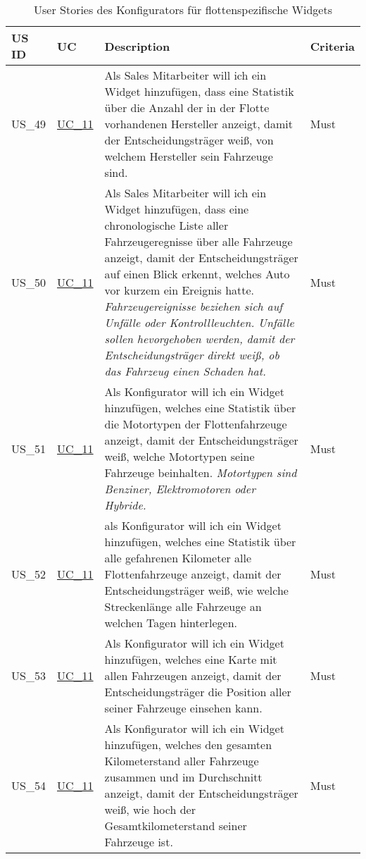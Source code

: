   \label{FlottenWidgets}
  \sffamily
  \begin{footnotesize}
    \begin{longtable}[L L L L ]{ p{} p{} p{} p{}}
      \caption                       %
          {User Stories des Konfigurators für flottenspezifische Widgets} %
          \\
      \toprule
      \textbf{US ID} & \textbf{UC} & \textbf{Description} & \textbf{Criteria} \\
      \midrule
      \hypertarget{Ref:US49}{US\_49} & \hyperlink{Ref:UC11}{UC\_11} & Als Sales Mitarbeiter will ich ein Widget hinzufügen, dass eine Statistik über die Anzahl der in der Flotte vorhandenen Hersteller anzeigt, damit der Entscheidungsträger weiß, von welchem Hersteller sein Fahrzeuge sind. & Must  \\
      \hypertarget{Ref:US50}{US\_50} & \hyperlink{Ref:UC11}{UC\_11} & Als Sales Mitarbeiter will ich ein Widget hinzufügen, dass eine chronologische Liste aller Fahrzeugeregnisse über alle Fahrzeuge anzeigt, damit der Entscheidungsträger auf einen Blick erkennt, welches Auto vor kurzem ein Ereignis hatte.
      \newline\newline
      \emph{Fahrzeugereignisse beziehen sich auf Unfälle oder Kontrollleuchten. Unfälle sollen hevorgehoben werden, damit der Entscheidungsträger direkt weiß, ob das Fahrzeug einen Schaden hat.} & Must \\
      \hypertarget{Ref:US51}{US\_51} & \hyperlink{Ref:UC11}{UC\_11} & Als Konfigurator will ich ein Widget hinzufügen, welches eine Statistik über die Motortypen der Flottenfahrzeuge anzeigt, damit der Entscheidungsträger weiß, welche Motortypen seine Fahrzeuge beinhalten. 
      \newline\newline
      \emph{Motortypen sind Benziner, Elektromotoren oder Hybride.} & Must \\
      \hypertarget{Ref:US52}{US\_52} & \hyperlink{Ref:UC11}{UC\_11} & als Konfigurator will ich ein Widget hinzufügen, welches eine Statistik über alle gefahrenen Kilometer alle Flottenfahrzeuge anzeigt, damit der Entscheidungsträger weiß, wie welche Streckenlänge alle Fahrzeuge an welchen Tagen hinterlegen. & Must \\
      \hypertarget{Ref:US53}{US\_53} & \hyperlink{Ref:UC11}{UC\_11} & Als Konfigurator will ich ein Widget hinzufügen, welches eine Karte mit allen Fahrzeugen anzeigt, damit der Entscheidungsträger die Position aller seiner Fahrzeuge einsehen kann. & Must \\
      \hypertarget{Ref:US54}{US\_54} & \hyperlink{Ref:UC11}{UC\_11} & Als Konfigurator will ich ein Widget hinzufügen, welches den gesamten Kilometerstand aller Fahrzeuge zusammen und im Durchschnitt anzeigt, damit der Entscheidungsträger weiß, wie hoch der Gesamtkilometerstand seiner Fahrzeuge ist. & Must \\
      \bottomrule
    \end{longtable}
  \end{footnotesize}
  \rmfamily

      
